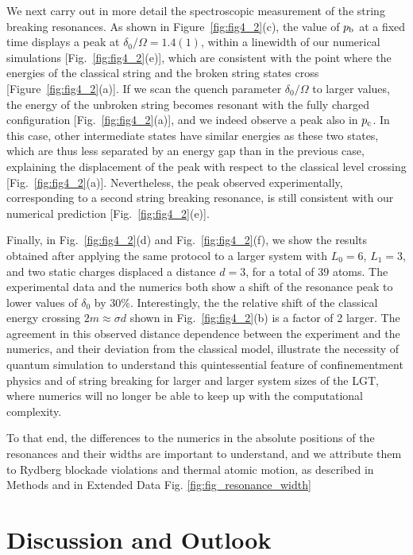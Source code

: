 \documentclass[footinbib,a4paper,aps,superscriptaddress,twocolumn,preprintnumbers,amsmath,amssymb,nobalancelastpage,10pt,prl]{revtex4-2}
\begin{document}
We next carry out in more detail the spectroscopic measurement of the string breaking resonances. As shown in Figure~\ref{fig:fig4_2}(c), the value of $p_{\rm b}$ at a fixed time displays a peak at $\delta_0/\Omega = 1.4(1)$, within a linewidth of our numerical simulations [Fig.~\ref{fig:fig4_2}(e)], which are consistent with the point where the energies of the classical string and the broken string states cross [Figure~\ref{fig:fig4_2}(a)]. If we scan the quench parameter $\delta_0 / \Omega$ to larger values, the energy of the unbroken string  becomes resonant with the fully charged configuration [Fig.~\ref{fig:fig4_2}(a)], and we indeed observe a peak also in $p_{\rm c}$. In this case, other intermediate states have similar energies as these two states, which are thus less separated by an energy gap than in the previous case, explaining the displacement of the peak with respect to the classical level crossing [Fig.~\ref{fig:fig4_2}(a)]. Nevertheless, the peak observed experimentally, corresponding to a second string breaking resonance, is still consistent with our numerical prediction [Fig.~\ref{fig:fig4_2}(e)].

Finally, in Fig.~\ref{fig:fig4_2}(d) and Fig.~\ref{fig:fig4_2}(f), we show the results obtained after applying the same protocol to a larger system with $L_0 = 6$, $L_1 = 3$, and two static charges displaced a distance $d = 3$, for a total of $39$ atoms. The experimental data and the numerics both show a shift of the resonance peak to lower values of $\delta_0$ by 30\%. Interestingly, the the relative shift of the classical energy crossing $2m\approx\sigma d$ shown in Fig.~\ref{fig:fig4_2}(b) is a factor of 2 larger. The agreement in this observed distance dependence between the experiment and the numerics, and their deviation from the classical model, illustrate the necessity of quantum simulation to understand this quintessential feature of confinementment physics and of string breaking for larger and larger system sizes of the LGT, where numerics will no longer be able to keep up with the computational complexity.

To that end, the differences to the numerics in the absolute positions of the resonances and their widths are important to understand, and we attribute them to Rydberg blockade violations and thermal atomic motion, as described in Methods and in Extended Data Fig. \ref{fig:fig_resonance_width}

\section*{Discussion and Outlook}
\end{document}
